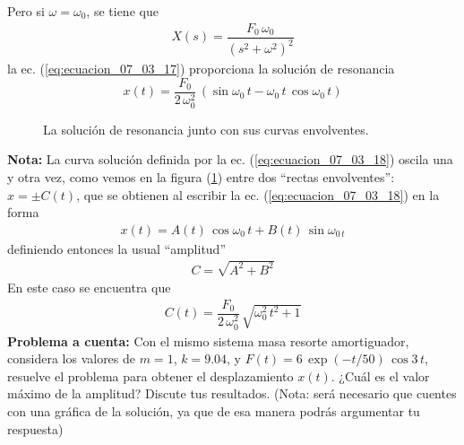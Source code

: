 Pero si $\omega = \omega_{0}$, se tiene que
\begin{align*}
X(s) = \dfrac{F_{0} \, \omega_{0}}{(s^{2} + \omega^{2})^{2}}
\end{align*}
la ec. (\ref{eq:ecuacion_07_03_17}) proporciona la solución de resonancia
\begin{equation}
x(t) = \dfrac{F_{0}}{2 \, \omega_{0}^{2}} \, (\sin \omega_{0} \, t - \omega_{0} \, t \, \cos \omega_{0} \, t )
\label{eq:ecuacion_07_03_18}
\end{equation}
\begin{figure}[!ht]
    \centering
    
    \caption{La solución de resonancia junto con sus curvas envolventes.}
    \label{fig_figura_07_03_04}
\end{figure}
\textbf{Nota:} La curva solución definida por la ec. (\ref{eq:ecuacion_07_03_18}) oscila una y otra vez, como vemos en la figura (\ref{fig_figura_07_03_04}) entre dos \enquote{rectas envolventes}: $x = \pm C(t)$, que se obtienen al escribir la ec. (\ref{eq:ecuacion_07_03_18}) en la forma
\begin{align*}
x(t) =  A(t) \, \cos \omega_{0} \, t +  B(t) \, \sin \omega_{0 \, t}
\end{align*}
definiendo entonces la usual \enquote{amplitud}
\begin{align*}
C = \sqrt{A^{2} +  B^{2}}
\end{align*}
En este caso se encuentra que
\begin{align*}
C(t) = \dfrac{F_{0}}{2 \, \omega_{0}^{2}} \, \sqrt{\omega_{0}^{2} \, t^{2} + 1}
\end{align*}
\textbf{Problema a cuenta: } Con el mismo sistema masa resorte amortiguador, considera los valores de $m = 1$, $k = 9.04$, y $F(t) =  6 \, \exp(-t/50) \, \cos 3 \, t$, resuelve el problema para obtener el desplazamiento $x(t)$. ¿Cuál es el valor máximo de la amplitud? Discute tus resultados. (Nota: será necesario que cuentes con una gráfica de la solución, ya que de esa manera podrás argumentar tu respuesta)
